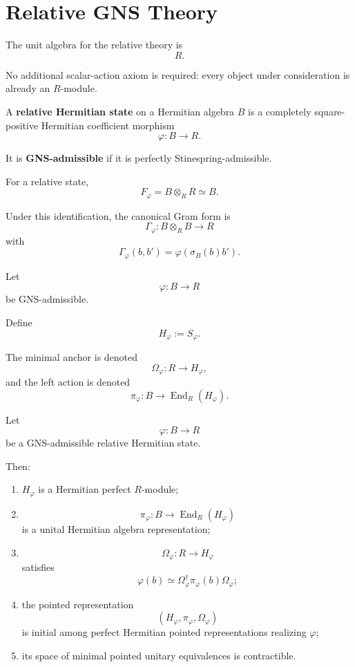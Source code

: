 \section{Relative GNS Theory}
\label{sec:higher-relative-gns}

The unit algebra for the relative theory is
\[
  R.
\]

No additional scalar-action axiom is required: every object under
consideration is already an \(R\)-module.

\begin{definition}
\label{def:higher-relative-hermitian-state}
A \textbf{relative Hermitian state} on a Hermitian algebra \(B\) is a
completely square-positive Hermitian coefficient morphism
\[
  \varphi:B\to R.
\]

It is \textbf{GNS-admissible} if it is perfectly
Stinespring-admissible.
\end{definition}

For a relative state,
\[
  F_\varphi
  =
  B\otimes_RR
  \simeq
  B.
\]

Under this identification, the canonical Gram form is
\[
  \Gamma_\varphi:
  B\otimes_RB\to R
\]
with
\[
  \Gamma_\varphi(b,b')
  =
  \varphi(\sigma_B(b)b').
\]

\begin{definition}
\label{def:higher-gns-object}
Let
\[
  \varphi:B\to R
\]
be GNS-admissible.

Define
\[
  H_\varphi
  :=
  S_\varphi.
\]

The minimal anchor is denoted
\[
  \Omega_\varphi:
  R\to H_\varphi,
\]
and the left action is denoted
\[
  \pi_\varphi:
  B
  \longrightarrow
  \operatorname{End}_R(H_\varphi).
\]
\end{definition}

\begin{theorem}
\label{thm:higher-relative-gns}
Let
\[
  \varphi:B\to R
\]
be a GNS-admissible relative Hermitian state.

Then:

\begin{enumerate}
  \item \(H_\varphi\) is a Hermitian perfect \(R\)-module;

  \item
  \[
    \pi_\varphi:
    B\to\operatorname{End}_R(H_\varphi)
  \]
  is a unital Hermitian algebra representation;

  \item
  \[
    \Omega_\varphi:R\to H_\varphi
  \]
  satisfies
  \[
    \varphi(b)
    \simeq
    \Omega_\varphi^\dagger
    \pi_\varphi(b)
    \Omega_\varphi;
  \]

  \item the pointed representation
  \[
    (H_\varphi,\pi_\varphi,\Omega_\varphi)
  \]
  is initial among perfect Hermitian pointed representations realizing
  \(\varphi\);

  \item its space of minimal pointed unitary equivalences is contractible.
\end{enumerate}
\end{theorem}

